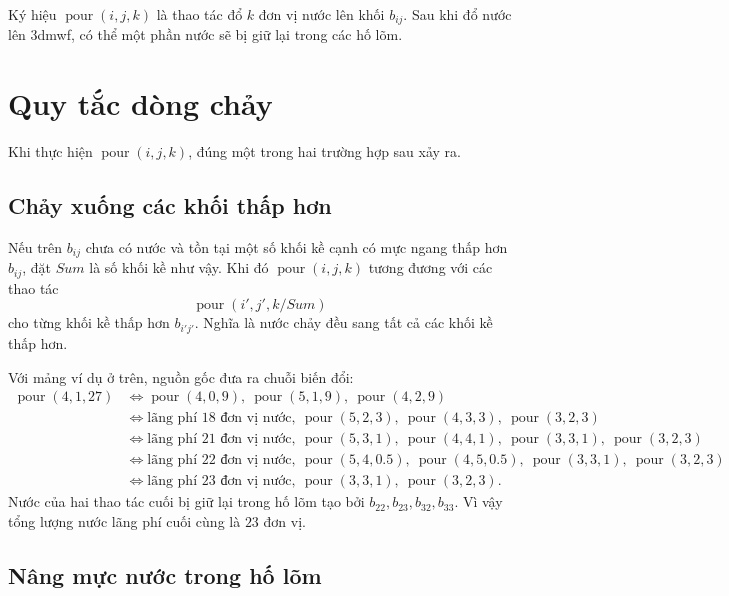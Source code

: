 \documentclass[11pt]{article}
\begin{document}
Ký hiệu \(\operatorname{pour}(i,j,k)\) là thao tác đổ \(k\) đơn vị nước lên
khối \(b_{ij}\). Sau khi đổ nước lên 3dmwf, có thể một phần nước sẽ bị giữ
lại trong các hố lõm.

\section{Quy tắc dòng chảy}

Khi thực hiện \(\operatorname{pour}(i,j,k)\), đúng một trong hai trường hợp
sau xảy ra.

\subsection{Chảy xuống các khối thấp hơn}

Nếu trên \(b_{ij}\) chưa có nước và tồn tại một số khối kề cạnh có mực ngang
thấp hơn \(b_{ij}\), đặt \(\mathit{Sum}\) là số khối kề như vậy. Khi đó
\(\operatorname{pour}(i,j,k)\) tương đương với các thao tác
\[
  \operatorname{pour}(i',j',k/\mathit{Sum})
\]
cho từng khối kề thấp hơn \(b_{i'j'}\). Nghĩa là nước chảy đều sang tất cả
các khối kề thấp hơn.

Với mảng ví dụ ở trên, nguồn gốc đưa ra chuỗi biến đổi:
\[
\begin{aligned}
\operatorname{pour}(4,1,27)
&\Longleftrightarrow
  \operatorname{pour}(4,0,9),\
  \operatorname{pour}(5,1,9),\
  \operatorname{pour}(4,2,9)\\
&\Longleftrightarrow
  \text{lãng phí }18\text{ đơn vị nước},\
  \operatorname{pour}(5,2,3),\
  \operatorname{pour}(4,3,3),\
  \operatorname{pour}(3,2,3)\\
&\Longleftrightarrow
  \text{lãng phí }21\text{ đơn vị nước},\
  \operatorname{pour}(5,3,1),\
  \operatorname{pour}(4,4,1),\
  \operatorname{pour}(3,3,1),\
  \operatorname{pour}(3,2,3)\\
&\Longleftrightarrow
  \text{lãng phí }22\text{ đơn vị nước},\
  \operatorname{pour}(5,4,0.5),\
  \operatorname{pour}(4,5,0.5),\
  \operatorname{pour}(3,3,1),\
  \operatorname{pour}(3,2,3)\\
&\Longleftrightarrow
  \text{lãng phí }23\text{ đơn vị nước},\
  \operatorname{pour}(3,3,1),\
  \operatorname{pour}(3,2,3).
\end{aligned}
\]
Nước của hai thao tác cuối bị giữ lại trong hố lõm tạo bởi
\(b_{22},b_{23},b_{32},b_{33}\). Vì vậy tổng lượng nước lãng phí cuối cùng là
\(23\) đơn vị.

\subsection{Nâng mực nước trong hố lõm}
\end{document}
